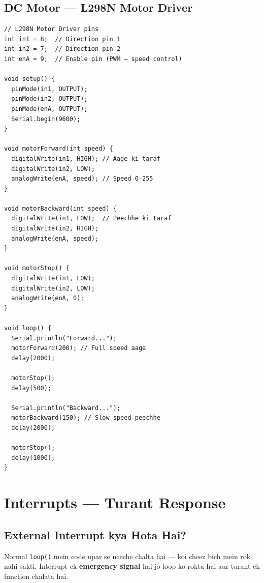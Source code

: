 \documentclass[12pt,a4paper]{article}
\begin{document}
\subsection{DC Motor — L298N Motor Driver}

\begin{tcolorbox}[codebox=Example 20: DC Motor Forward/Backward]
\begin{lstlisting}
// L298N Motor Driver pins
int in1 = 8;  // Direction pin 1
int in2 = 7;  // Direction pin 2
int enA = 9;  // Enable pin (PWM — speed control)

void setup() {
  pinMode(in1, OUTPUT);
  pinMode(in2, OUTPUT);
  pinMode(enA, OUTPUT);
  Serial.begin(9600);
}

void motorForward(int speed) {
  digitalWrite(in1, HIGH); // Aage ki taraf
  digitalWrite(in2, LOW);
  analogWrite(enA, speed); // Speed 0-255
}

void motorBackward(int speed) {
  digitalWrite(in1, LOW);  // Peechhe ki taraf
  digitalWrite(in2, HIGH);
  analogWrite(enA, speed);
}

void motorStop() {
  digitalWrite(in1, LOW);
  digitalWrite(in2, LOW);
  analogWrite(enA, 0);
}

void loop() {
  Serial.println("Forward...");
  motorForward(200); // Full speed aage
  delay(2000);

  motorStop();
  delay(500);

  Serial.println("Backward...");
  motorBackward(150); // Slow speed peechhe
  delay(2000);

  motorStop();
  delay(1000);
}
\end{lstlisting}
\end{tcolorbox}

\newpage

\section{Interrupts — Turant Response}

\subsection{External Interrupt kya Hota Hai?}

Normal \texttt{loop()} mein code upar se neeche chalta hai — koi cheez bich mein rok nahi sakti. Interrupt ek \textbf{emergency signal} hai jo loop ko rokta hai aur turant ek function chalata hai.
\end{document}
